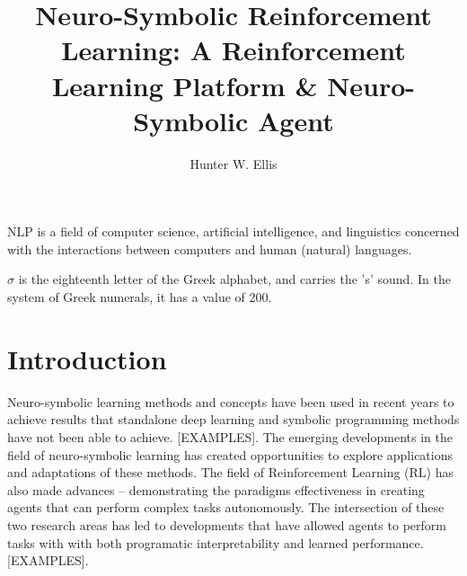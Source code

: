 \documentclass[doublespace,draft,nopageskip]{VTthesis} %
\title{
Neuro-Symbolic Reinforcement Learning: A Reinforcement Learning Platform \& Neuro-Symbolic Agent}
\author{Hunter W. Ellis}
\begin{document}
  \frontmatter
  \maketitle
  \tableofcontents

	\listoffigures
	\listoftables
    \printnomenclature %

NLP is a field of computer science, artificial intelligence, and linguistics concerned with the interactions between computers and human (natural) languages.
 
 
$\sigma$ is the eighteenth letter of the Greek alphabet, and carries the 's' sound. In the system of Greek numerals, it has a value of 200. 
 

	\mainmatter

	\chapter{Introduction} \label{ch:introduction}
    Neuro-symbolic learning methods and concepts have been used in recent years to achieve results that standalone deep learning and symbolic programming methods have not been able to achieve. [EXAMPLES]. The emerging developments in the field of neuro-symbolic learning has created opportunities to explore applications and adaptations of these methods. The field of Reinforcement Learning (RL) has also made advances -- demonstrating the paradigms effectiveness in creating agents that can perform complex tasks autonomously. The intersection of these two research areas has led to developments that have allowed agents to perform tasks with with both programatic interpretability and learned performance. [EXAMPLES].
\end{document}
